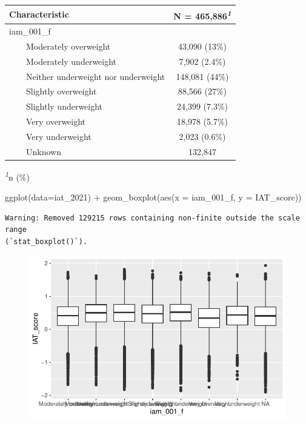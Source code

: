 \documentclass[
  letterpaper,
  DIV=11,
  numbers=noendperiod]{scrartcl}
\newenvironment{Shaded}{\begin{snugshade}}{\end{snugshade}}
\newcommand{\AttributeTok}[1]{\textcolor[rgb]{0.40,0.45,0.13}{#1}}
\newcommand{\FunctionTok}[1]{\textcolor[rgb]{0.28,0.35,0.67}{#1}}
\newcommand{\NormalTok}[1]{\textcolor[rgb]{0.00,0.23,0.31}{#1}}
\newcommand{\SpecialCharTok}[1]{\textcolor[rgb]{0.37,0.37,0.37}{#1}}
\begin{document}
\begin{tcolorbox}
\begin{table}
\fontsize{12.0pt}{14.4pt}\selectfont
\begin{tabular*}{\linewidth}{@{\extracolsep{\fill}}lc}
\toprule
\textbf{Characteristic} & \textbf{N = 465,886}\textsuperscript{\textit{1}} \\ 
\midrule\addlinespace[2.5pt]
iam\_001\_f &  \\ 
    Moderately overweight & 43,090 (13\%) \\ 
    Moderately underweight & 7,902 (2.4\%) \\ 
    Neither underweight nor underweight & 148,081 (44\%) \\ 
    Slightly overweight & 88,566 (27\%) \\ 
    Slightly underweight & 24,399 (7.3\%) \\ 
    Very overweight & 18,978 (5.7\%) \\ 
    Very underweight & 2,023 (0.6\%) \\ 
    Unknown & 132,847 \\ 
\bottomrule
\end{tabular*}
\begin{minipage}{\linewidth}
\textsuperscript{\textit{1}}n (\%)\\
\end{minipage}
\end{table}

\begin{Shaded}
\begin{Highlighting}[]
\FunctionTok{ggplot}\NormalTok{(}\AttributeTok{data=}\NormalTok{iat\_2021) }\SpecialCharTok{+}
  \FunctionTok{geom\_boxplot}\NormalTok{(}\FunctionTok{aes}\NormalTok{(}\AttributeTok{x =}\NormalTok{ iam\_001\_f, }\AttributeTok{y =}\NormalTok{ IAT\_score))}
\end{Highlighting}
\end{Shaded}

\begin{verbatim}
Warning: Removed 129215 rows containing non-finite outside the scale range
(`stat_boxplot()`).
\end{verbatim}

\begin{figure}[H]

{\centering \includegraphics{Lab_02_instructions_files/figure-pdf/unnamed-chunk-7-1.pdf}

}
\end{figure}
\end{tcolorbox}
\end{document}
